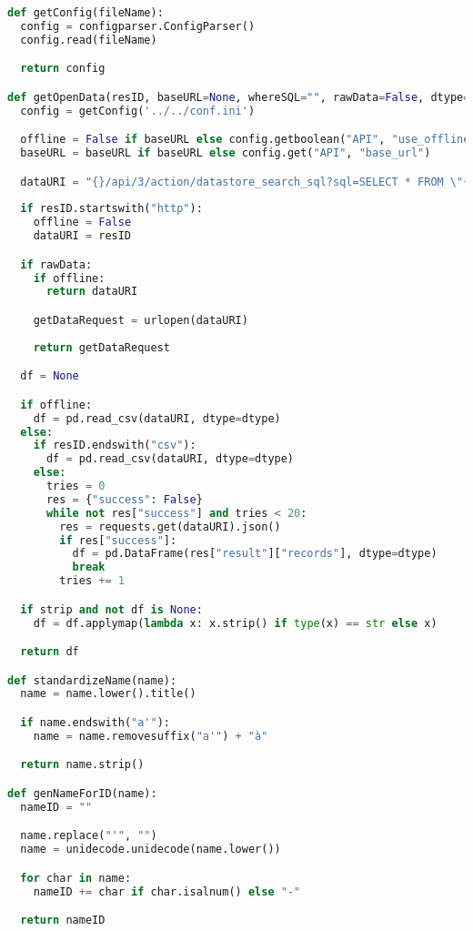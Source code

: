 \begin{lstlisting}[language=python,caption={The common functions in the utils package.},label=code:utils-py]
def getConfig(fileName):
  config = configparser.ConfigParser()
  config.read(fileName)

  return config

def getOpenData(resID, baseURL=None, whereSQL="", rawData=False, dtype=None, strip=True):
  config = getConfig('../../conf.ini')

  offline = False if baseURL else config.getboolean("API", "use_offline")
  baseURL = baseURL if baseURL else config.get("API", "base_url")

  dataURI = "{}/api/3/action/datastore_search_sql?sql=SELECT * FROM \"{}\" {}".format(baseURL, resID, whereSQL) if not offline else "../../off_data/{}".format(resID)
  
  if resID.startswith("http"):
    offline = False
    dataURI = resID

  if rawData:
    if offline:
      return dataURI

    getDataRequest = urlopen(dataURI)
    
    return getDataRequest

  df = None

  if offline:
    df = pd.read_csv(dataURI, dtype=dtype)
  else:
    if resID.endswith("csv"):
      df = pd.read_csv(dataURI, dtype=dtype)
    else:
      tries = 0
      res = {"success": False}
      while not res["success"] and tries < 20:
        res = requests.get(dataURI).json()
        if res["success"]:
          df = pd.DataFrame(res["result"]["records"], dtype=dtype)
          break
        tries += 1

  if strip and not df is None:
    df = df.applymap(lambda x: x.strip() if type(x) == str else x)

  return df

def standardizeName(name):
  name = name.lower().title()

  if name.endswith("a'"):
    name = name.removesuffix("a'") + "à"

  return name.strip()

def genNameForID(name):
  nameID = ""

  name.replace("'", "")
  name = unidecode.unidecode(name.lower())

  for char in name:
    nameID += char if char.isalnum() else "-"

  return nameID
\end{lstlisting}

